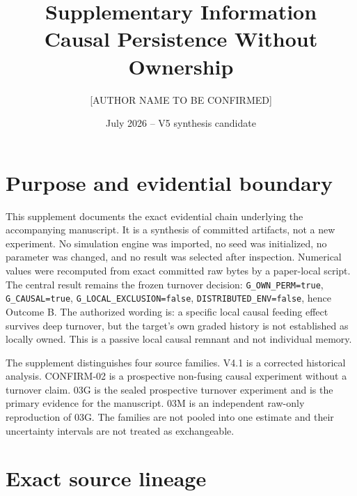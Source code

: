 \documentclass[10pt]{article}
\title{Supplementary Information\\\large Causal Persistence Without Ownership}
\author{[AUTHOR NAME TO BE CONFIRMED]}
\date{July 2026 -- V5 synthesis candidate}
\newcommand{\code}[1]{\texttt{#1}}
\begin{document}
\maketitle
\tableofcontents

\section{Purpose and evidential boundary}

This supplement documents the exact evidential chain underlying the accompanying manuscript. It is a synthesis of committed artifacts, not a new experiment. No simulation engine was imported, no seed was initialized, no parameter was changed, and no result was selected after inspection. Numerical values were recomputed from exact committed raw bytes by a paper-local script. The central result remains the frozen turnover decision: \code{G\_OWN\_PERM=true}, \code{G\_CAUSAL=true}, \code{G\_LOCAL\_EXCLUSION=false}, \code{DISTRIBUTED\_ENV=false}, hence Outcome B. The authorized wording is: a specific local causal feeding effect survives deep turnover, but the target's own graded history is not established as locally owned. This is a passive local causal remnant and not individual memory.

The supplement distinguishes four source families. V4.1 is a corrected historical analysis. CONFIRM-02 is a prospective non-fusing causal experiment without a turnover claim. 03G is the sealed prospective turnover experiment and is the primary evidence for the manuscript. 03M is an independent raw-only reproduction of 03G. The families are not pooled into one estimate and their uncertainty intervals are not treated as exchangeable.

\section{Exact source lineage}
\end{document}
